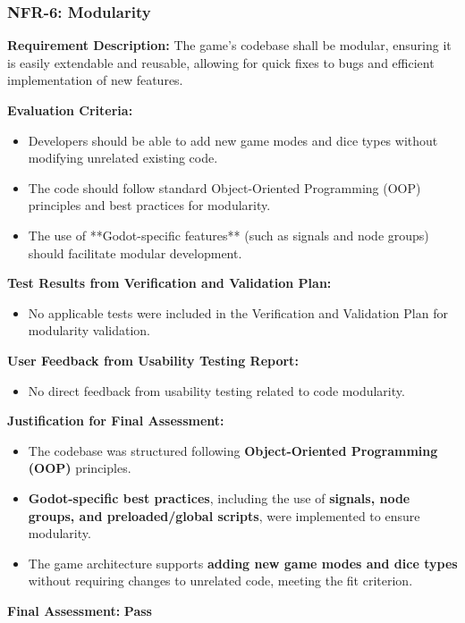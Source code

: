 \documentclass[12pt, titlepage]{article}
\begin{document}
\subsubsection{NFR-6: Modularity}
\label{NFR6}

\textbf{Requirement Description:}  
The game’s codebase shall be modular, ensuring it is easily extendable and reusable, allowing for quick fixes to bugs and efficient implementation of new features.

\textbf{Evaluation Criteria:}  
\begin{itemize}
    \item Developers should be able to add new game modes and dice types without modifying unrelated existing code.
    \item The code should follow standard Object-Oriented Programming (OOP) principles and best practices for modularity.
    \item The use of **Godot-specific features** (such as signals and node groups) should facilitate modular development.
\end{itemize}

\textbf{Test Results from Verification and Validation Plan:}  
\begin{itemize}
    \item No applicable tests were included in the Verification and Validation Plan for modularity validation.
\end{itemize}

\textbf{User Feedback from Usability Testing Report:}  
\begin{itemize}
    \item No direct feedback from usability testing related to code modularity.
\end{itemize}

\textbf{Justification for Final Assessment:}  
\begin{itemize}
    \item The codebase was structured following \textbf{Object-Oriented Programming (OOP)} principles.
    \item \textbf{Godot-specific best practices}, including the use of \textbf{signals, node groups, and preloaded/global scripts}, were implemented to ensure modularity.
    \item The game architecture supports \textbf{adding new game modes and dice types} without requiring changes to unrelated code, meeting the fit criterion.
\end{itemize}

\textbf{Final Assessment:} \textbf{Pass}  
\end{document}
